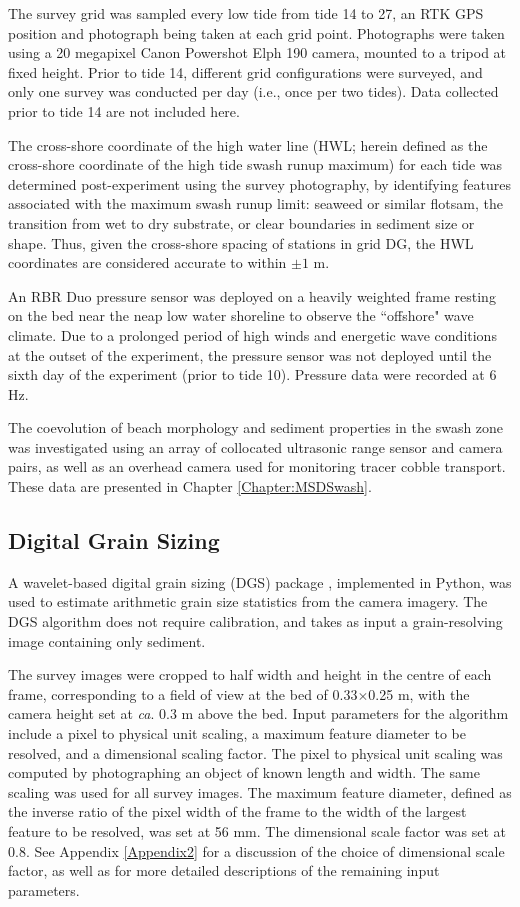 The survey grid was sampled every low tide from tide 14 to 27, an RTK GPS position and photograph being taken at each grid point. Photographs were taken using a 20 megapixel Canon Powershot Elph 190 camera, mounted to a tripod at fixed height. Prior to tide 14, different grid configurations were surveyed, and only one survey was conducted per day (i.e., once per two tides). Data collected prior to tide 14 are not included here. 

The cross-shore coordinate of the high water line (HWL; herein defined as the cross-shore coordinate of the high tide swash runup maximum) for each tide was determined post-experiment using the survey photography, by identifying features associated with the maximum swash runup limit: seaweed or similar flotsam, the transition from wet to dry substrate, or clear boundaries in sediment size or shape. Thus, given the cross-shore spacing of stations in grid DG, the HWL coordinates are considered accurate to within $\pm1$ m. 

An RBR Duo pressure sensor was deployed on a heavily weighted frame resting on the bed near the neap low water shoreline to observe the ``offshore" wave climate. Due to a prolonged period of high winds and energetic wave conditions at the outset of the experiment, the pressure sensor was not deployed until the sixth day of the experiment (prior to tide 10). Pressure data were recorded at 6 Hz.

The coevolution of beach morphology and sediment properties in the swash zone was investigated using an array of collocated ultrasonic range sensor and camera pairs, as well as an overhead camera used for monitoring tracer cobble transport. These data are presented in Chapter \ref{Chapter:MSDSwash}.

\subsection{Digital Grain Sizing}

A wavelet-based digital grain sizing (DGS) package \citep[see][]{Buscombe2013}, implemented in Python, was used to estimate arithmetic grain size statistics from the camera imagery. The DGS algorithm does not require calibration, and takes as input a grain-resolving image containing only sediment. 

The survey images were cropped to half width and height in the centre of each frame, corresponding to a field of view at the bed of 0.33$\times$0.25 m, with the camera height set at \textit{ca}. 0.3 m above the bed. Input parameters for the algorithm include a pixel to physical unit scaling, a maximum feature diameter to be resolved, and a dimensional scaling factor. The pixel to physical unit scaling was computed by photographing an object of known length and width. The same scaling was used for all survey images. The maximum feature diameter, defined as the inverse ratio of the pixel width of the frame to the width of the largest feature to be resolved, was set at 56 mm. The dimensional scale factor was set at 0.8. See Appendix \ref{Appendix2} for a discussion of the choice of dimensional scale factor, as well as for more detailed descriptions of the remaining input parameters. 

